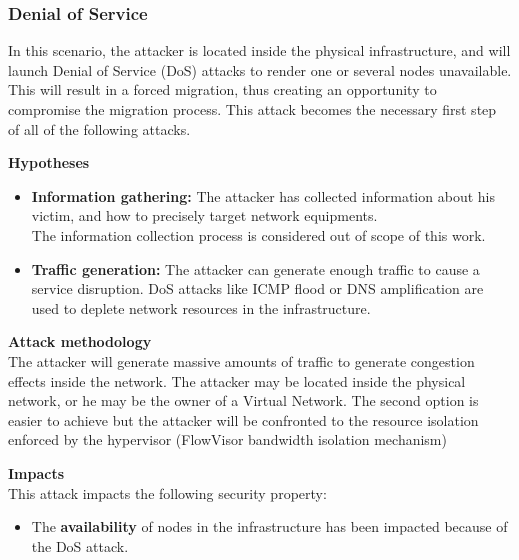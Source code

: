 \subsubsection{Denial of Service}
In this scenario, the attacker is located inside the physical infrastructure, and will launch Denial of Service (DoS) attacks to render one or several nodes unavailable.
This will result in a forced migration, thus creating an opportunity to compromise the migration process.
This attack becomes the necessary first step of all of the following attacks.

\textbf{Hypotheses}
\begin{itemize}
    \item \textbf{Information gathering:} The attacker has collected information about his victim, and how to precisely target network equipments.\\
The information collection process is considered out of scope of this work.
    \item \textbf{Traffic generation:} The attacker can generate enough traffic to cause a service disruption.
DoS attacks like ICMP flood or DNS amplification are used to deplete network resources in the infrastructure.
\end{itemize}

\textbf{Attack methodology}\textbf{\\}
The attacker will generate massive amounts of traffic to generate congestion effects inside the network. The attacker may be located inside the physical network, or he may be the owner of a Virtual Network. The second option is easier to achieve but the attacker will be confronted to the resource isolation enforced by the hypervisor (\ie FlowVisor bandwidth isolation mechanism)


\textbf{Impacts}\textbf{\\}
This attack impacts the following security property:
\begin{itemize}
    \item The \textbf{availability} of nodes in the infrastructure has been impacted because of the DoS attack.
\end{itemize}


